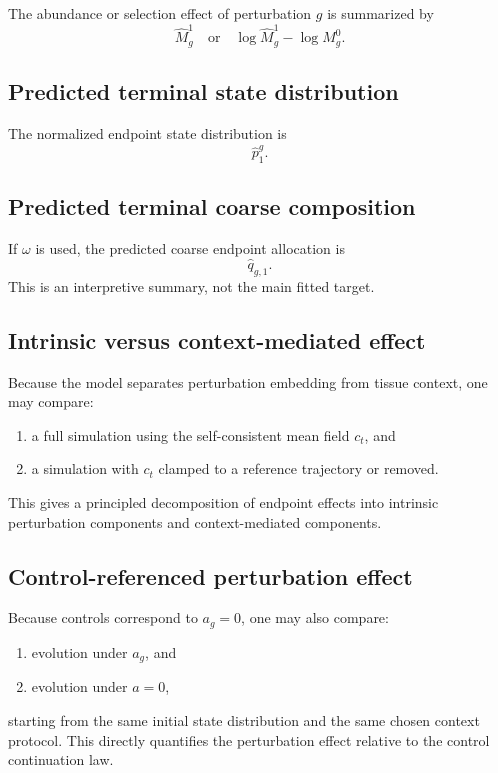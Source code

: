 \documentclass[11pt]{article}
\begin{document}
The abundance or selection effect of perturbation $g$ is summarized by
\[
\hat M_g^1
\quad \text{or} \quad
\log \hat M_g^1 - \log M_g^0.
\]

\subsection{Predicted terminal state distribution}

The normalized endpoint state distribution is
\[
\hat p_1^g.
\]

\subsection{Predicted terminal coarse composition}

If $\omega$ is used, the predicted coarse endpoint allocation is
\[
\hat q_{g,1}.
\]
This is an interpretive summary, not the main fitted target.

\subsection{Intrinsic versus context-mediated effect}

Because the model separates perturbation embedding from tissue context, one may compare:
\begin{enumerate}[label=(\alph*),leftmargin=2.2em]
    \item a full simulation using the self-consistent mean field $c_t$, and
    \item a simulation with $c_t$ clamped to a reference trajectory or removed.
\end{enumerate}
This gives a principled decomposition of endpoint effects into intrinsic perturbation components and context-mediated components.

\subsection{Control-referenced perturbation effect}

Because controls correspond to $a_g=0$, one may also compare:
\begin{enumerate}[label=(\alph*),leftmargin=2.2em]
    \item evolution under $a_g$, and
    \item evolution under $a=0$,
\end{enumerate}
starting from the same initial state distribution and the same chosen context protocol. This directly quantifies the perturbation effect relative to the control continuation law.
\end{document}
